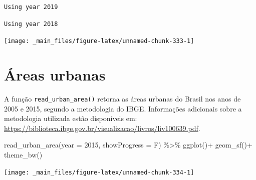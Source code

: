 \documentclass[
  brazilian,
]{book}
\newenvironment{Shaded}{\begin{snugshade}}{\end{snugshade}}
\newcommand{\AttributeTok}[1]{\textcolor[rgb]{0.77,0.63,0.00}{#1}}
\newcommand{\DecValTok}[1]{\textcolor[rgb]{0.00,0.00,0.81}{#1}}
\newcommand{\FunctionTok}[1]{\textcolor[rgb]{0.00,0.00,0.00}{#1}}
\newcommand{\NormalTok}[1]{#1}
\newcommand{\SpecialCharTok}[1]{\textcolor[rgb]{0.00,0.00,0.00}{#1}}
\begin{document}
\begin{verbatim}
Using year 2019
\end{verbatim}

\begin{verbatim}
Using year 2018
\end{verbatim}

\begin{center}\texttt{[image: \_main\_files/figure-latex/unnamed-chunk-333-1]} \end{center}

\hypertarget{uxe1reas-urbanas}{%
\section{Áreas urbanas}\label{uxe1reas-urbanas}}

A função \texttt{read\_urban\_area()} retorna as áreas urbanas do Brasil nos anos de 2005 e 2015, segundo a metodologia do IBGE. Informações adicionais sobre a metodologia utilizada estão disponíveis em: \url{https://biblioteca.ibge.gov.br/visualizacao/livros/liv100639.pdf}.

\begin{Shaded}
\begin{Highlighting}[]
\FunctionTok{read\_urban\_area}\NormalTok{(}\AttributeTok{year =} \DecValTok{2015}\NormalTok{,}
                \AttributeTok{showProgress =}\NormalTok{ F) }\SpecialCharTok{\%\textgreater{}\%} 
  \FunctionTok{ggplot}\NormalTok{()}\SpecialCharTok{+}
  \FunctionTok{geom\_sf}\NormalTok{()}\SpecialCharTok{+}
  \FunctionTok{theme\_bw}\NormalTok{()}
\end{Highlighting}
\end{Shaded}

\begin{center}\texttt{[image: \_main\_files/figure-latex/unnamed-chunk-334-1]} \end{center}
\end{document}
